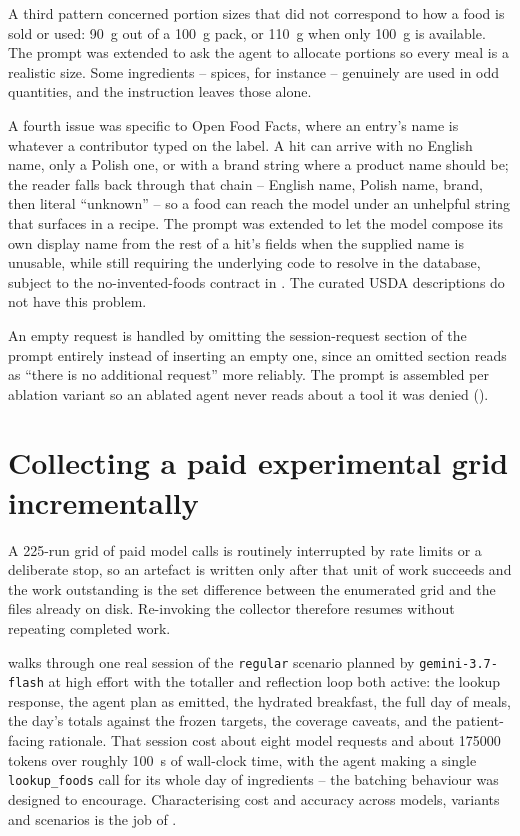 A third pattern concerned portion sizes that did not correspond to how a food is sold or used: \qty{90}{\gram} out of a \qty{100}{\gram} pack, or \qty{110}{\gram} when only \qty{100}{\gram} is available. The prompt was extended to ask the agent to allocate portions so every meal is a realistic size. Some ingredients -- spices, for instance -- genuinely are used in odd quantities, and the instruction leaves those alone.

A fourth issue was specific to Open Food Facts, where an entry's name is whatever a contributor typed on the label. A hit can arrive with no English name, only a Polish one, or with a brand string where a product name should be; the reader falls back through that chain -- English name, Polish name, brand, then literal \enquote{unknown} -- so a food can reach the model under an unhelpful string that surfaces in a recipe. The prompt was extended to let the model compose its own display name from the rest of a hit's fields when the supplied name is unusable, while still requiring the underlying code to resolve in the database, subject to the no-invented-foods contract in . The curated USDA descriptions do not have this problem.

An empty request is handled by omitting the session-request section of the prompt entirely instead of inserting an empty one, since an omitted section reads as \enquote{there is no additional request} more reliably. The prompt is assembled per ablation variant so an ablated agent never reads about a tool it was denied ().

\section{Collecting a paid experimental grid incrementally}
\label{sec:impl-eval-harness}

A \num{225}-run grid of paid model calls is routinely interrupted by rate limits or a deliberate stop, so an artefact is written only after that unit of work succeeds and the work outstanding is the set difference between the enumerated grid and the files already on disk. Re-invoking the collector therefore resumes without repeating completed work.

 walks through one real session of the \texttt{regular} scenario planned by \texttt{gemini-3.7-flash} at high effort with the totaller and reflection loop both active: the lookup response, the agent plan as emitted, the hydrated breakfast, the full day of meals, the day's totals against the frozen targets, the coverage caveats, and the patient-facing rationale. That session cost about eight model requests and about \num{175000} tokens over roughly \qty{100}{\second} of wall-clock time, with the agent making a single \texttt{lookup\_foods} call for its whole day of ingredients -- the batching behaviour  was designed to encourage. Characterising cost and accuracy across models, variants and scenarios is the job of .

